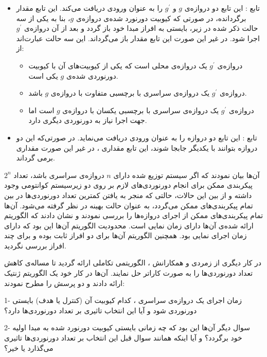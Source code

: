 \begin{itemize}
\item
تابع : این تابع دو دروازه‌ی $g$ و $g^{'}$ را به عنوان ورودی دریافت می‌کند. این تابع مقدار  برگردانده، در صورتی که کیوبیت دورنورد شده‌ی دروازه‌ی $g$، بنا به یکی از سه حالت ذکر شده در زیر، بایستی به افراز مبدا خود باز گردد و بعد از آن دروازه‌ی $g^{'}$  اجرا شود. در غیر این صورت این تابع مقدار  باز می‌گرداند. این سه حالت عبارت‌اند از:

\begin{itemize}
\item
دروازه‌ی $g^{'}$ یک دروازه‌ی محلی است که یکی از کیوبیت‌های آن با کیوبیت‌ دورنوردی شده‌ی $g$ یکی است.
\item
دروازه‌ی  $g^{'}$ یک دروازه‌ی سراسری با برچسبی متفاوت با دروازه‌ی $g$ باشد.
\item
دروازه‌ی $g^{'}$ یک دروازه‌ی سراسری با برچسبی یکسان با دروازه‌ی $g$ است اما جهت اجرا نیاز به دورنوردی دیگری دارد.
\end{itemize}
\item
تابع : این تابع دو دروازه را به عنوان ورودی دریافت می‌نماید. در صورتی‌که این دو دروازه بتوانند با یکدیگر جابجا شوند، این تابع مقداری ، در غیر این صورت مقداری  برمی گرداند. 
\end{itemize}


آن‌ها بیان نمودند که اگر سیستم توزیع شده دارای  $n$ دروازه‌ی سراسری باشد، تعداد $2^{n}$ پیکربندی ممکن برای انجام دورنوردی‌های لازم بر روی دو زیرسیستم کوانتومی وجود داشته و از بین این حالات، حالتی که منجر به یافتن کمترین تعداد دورنوردی‌ها در بین تمام پیکربندی‌های ممکن می‌گردد، به عنوان حالت بهینه در نظر گرفته می‌شود. آن‌ها تمام پیکربندی‌های ممکن از اجرای دروازه‌ها را بررسی نمودند و نشان دادند که الگوریتم ارائه شده‌ی آن‌ها دارای زمان نمایی است. محدودیت الگوریتم آن‌ها این بود که دارای زمان اجرای نمایی بود. همچنین الگوریتم آن‌ها برای دو افراز ثابت بوده و برای چند افراز بررسی نگردید.

در کار دیگری از زمردی و همکارانش \cite{ZomorodiE}، الگوریتمی تکاملی ارائه گردید تا مساله‌ی کاهش تعداد دورنوردی‌ها را به صورت کاراتر حل نمایند. آن‌ها در کار خود یک الگوریتم ژنتیک ارائه دادند و دو پرسش را مطرح نمودند:

1- زمان اجرای یک دروازه‌ی سراسری ، کدام کیوبیت آن (کنترل یا هدف) بایستی دورنوردی شود و آیا این انتخاب تاثیری بر تعداد دورنوردی‌ها دارد؟

2- سوال دیگر آن‌ها این بود که چه زمانی بایستی کیوبیت دورنورد شده به مبدا اولیه خود برگردد؟ و آیا اینکه همانند سوال قبل این انتخاب بر تعداد دورنوردی‌ها تاثیری می‌گذارد یا خیر؟

